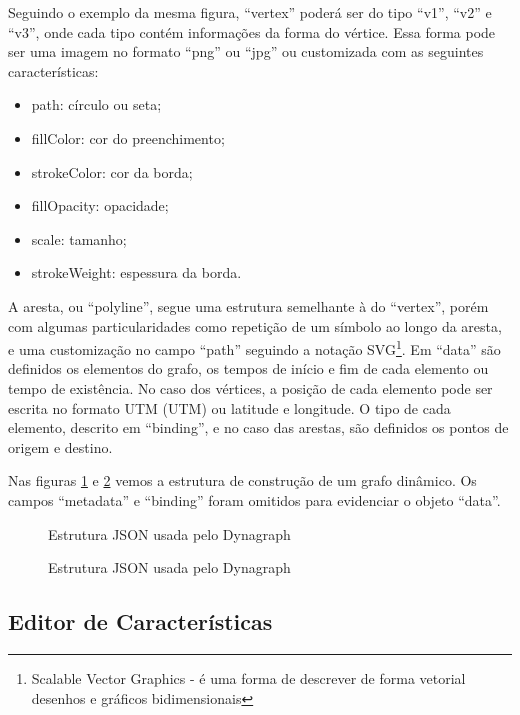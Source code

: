 Seguindo o exemplo da mesma figura, ``vertex'' poderá
ser do tipo ``v1'', ``v2'' e ``v3'', onde cada tipo contém informações da forma do vértice. Essa forma pode ser uma imagem no formato
``png'' ou ``jpg'' ou customizada com as seguintes características:
\begin{itemize}
\item path: círculo ou seta;
\item fillColor: cor do preenchimento;
\item strokeColor: cor da borda;
\item fillOpacity: opacidade;
\item scale: tamanho;
\item strokeWeight: espessura da borda.
\end{itemize}

A aresta, ou ``polyline'', segue uma estrutura semelhante à do ``vertex'', porém com algumas particularidades como repetição de um símbolo
ao longo da aresta, e uma customização no campo ``path'' seguindo a notação SVG\footnote{\label{note} Scalable Vector Graphics - é uma forma de descrever de forma vetorial desenhos e gráficos bidimensionais}.
Em ``data'' são definidos os elementos do grafo, os tempos de início e fim de cada elemento ou tempo de existência. No caso dos vértices, a posição de cada elemento pode ser escrita no formato \acrshort{UTM} (\acrlong{UTM}) ou latitude e longitude.
O tipo de cada elemento, descrito em ``binding'', e no caso das arestas, são definidos os pontos de origem e destino.

Nas figuras \ref{fig:jsondynagraphVertex} e \ref{fig:jsondynagraphAresta} vemos a estrutura de construção de um grafo dinâmico. Os campos ``metadata'' e ``binding'' foram omitidos para evidenciar o objeto ``data''.

\begin{figure}[!ht]
  \caption{Estrutura JSON usada pelo Dynagraph}
  \label{fig:jsondynagraphVertex}
\end{figure}


\begin{figure}[!ht]
  \caption{Estrutura JSON usada pelo Dynagraph}
  \label{fig:jsondynagraphAresta}
\end{figure}


\subsection{Editor de Características}

